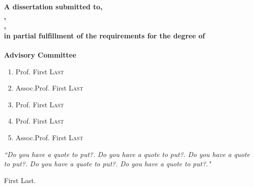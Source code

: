 \documentclass[11pt, oneside]{Thesis} %
\begin{document}
\begin{titlepage}
\begin{large}
\null\vfill
\centering
\textbf{A dissertation submitted to\deptname,\\
\facname,\\
\univname,\\
in partial fulfillment of the requirements for the degree of\\
\degreename}\\[2.5cm]

\textbf{Advisory Committee}\\[0.5cm]
\begin{enumerate}
\item Prof. First \textsc{Last}
	\\
\item Assoc.Prof. First \textsc{Last}
	\\
\item Prof. First \textsc{Last}
\item Prof. First \textsc{Last}
\item Assoc.Prof. First \textsc{Last}
\end{enumerate}
\null\vfill
\end{large}
\end{titlepage}



\pagestyle{empty} %

\null\vfill %

\textit{``Do you have a quote to put?. Do you have a quote to put?. Do you have a quote to put?. Do you have a quote to put?. Do you have a quote to put?."}

\begin{flushright}
First Last.
\end{flushright}

\vfill\vfill\vfill\vfill\vfill\vfill\null %
\clearpage %
\end{document}
